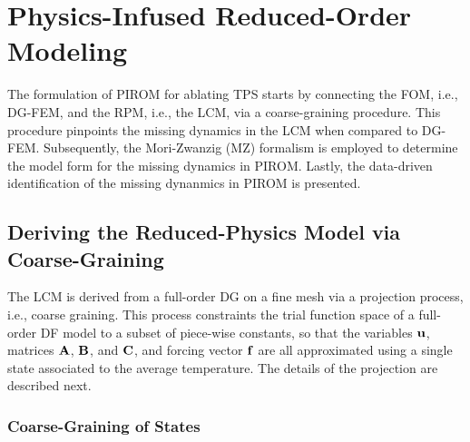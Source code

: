 \section{Physics-Infused Reduced-Order Modeling}\label{sec_pirom}

The formulation of PIROM for ablating TPS starts by connecting the FOM, i.e., DG-FEM, and the RPM, i.e., the LCM, via a coarse-graining procedure. This procedure pinpoints the missing dynamics in the LCM when compared to DG-FEM. Subsequently, the Mori-Zwanzig (MZ) formalism is employed to determine the model form for the missing dynamics in PIROM. Lastly, the data-driven identification of the missing dynanmics in PIROM is presented.

\subsection{Deriving the Reduced-Physics Model via Coarse-Graining}

The LCM is derived from a full-order DG on a fine mesh via a projection process, i.e., coarse graining. This process constraints the trial function space of a full-order DF model to a subset of piece-wise constants, so that the variables $\mathbf{u}$, matrices $\mathbf{A}$, $\mathbf{B}$, and $\mathbf{C}$, and forcing vector $\mathbf{f}$ are all approximated using a single state associated to the average temperature. The details of the projection are described next.

\subsubsection{Coarse-Graining of States}



